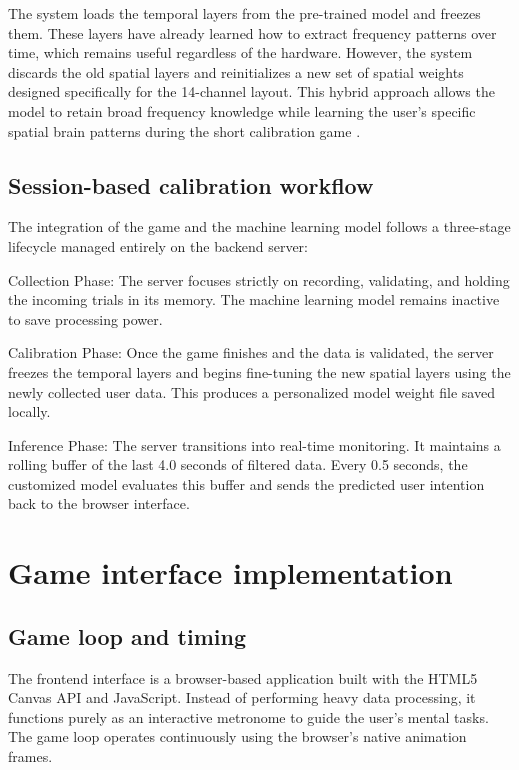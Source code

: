 \documentclass[a4paper, 11pt, openany]{report}
\let\cite\citep
\begin{document}
    The system loads the temporal layers from the pre-trained model and freezes them. These layers have already learned how to extract frequency patterns over time, which remains useful regardless of the hardware. However, the system discards the old spatial layers and reinitializes a new set of spatial weights designed specifically for the 14-channel layout. This hybrid approach allows the model to retain broad frequency knowledge while learning the user's specific spatial brain patterns during the short calibration game \cite{lawhern2018eegnet, giles2022transfer}.

    \subsection{Session-based calibration workflow}
    
    The integration of the game and the machine learning model follows a three-stage lifecycle managed entirely on the backend server:

    Collection Phase: The server focuses strictly on recording, validating, and holding the incoming trials in its memory. The machine learning model remains inactive to save processing power.

    Calibration Phase: Once the game finishes and the data is validated, the server freezes the temporal layers and begins fine-tuning the new spatial layers using the newly collected user data. This produces a personalized model weight file saved locally.

    Inference Phase: The server transitions into real-time monitoring. It maintains a rolling buffer of the last 4.0 seconds of filtered data. Every 0.5 seconds, the customized model evaluates this buffer and sends the predicted user intention back to the browser interface.


    \section{Game interface implementation}

    \subsection{Game loop and timing}
    
    The frontend interface is a browser-based application built with the HTML5 Canvas API and JavaScript. Instead of performing heavy data processing, it functions purely as an interactive metronome to guide the user's mental tasks. The game loop operates continuously using the browser's native animation frames.
\end{document}
